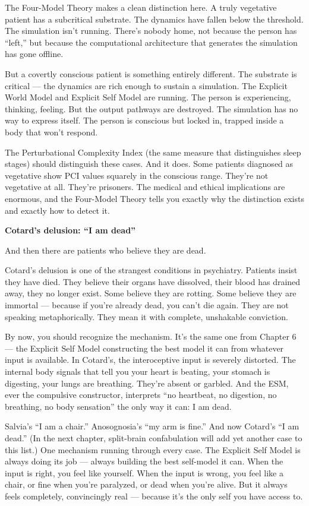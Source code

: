 \documentclass[11pt, twoside, openright]{book}
\begin{document}
The Four-Model Theory makes a clean distinction here. A truly vegetative patient has a subcritical substrate. The dynamics have fallen below the threshold. The simulation isn't running. There's nobody home, not because the person has ``left,'' but because the computational architecture that generates the simulation has gone offline.

But a covertly conscious patient is something entirely different. The substrate is critical --- the dynamics are rich enough to sustain a simulation. The Explicit World Model and Explicit Self Model are running. The person is experiencing, thinking, feeling. But the output pathways are destroyed. The simulation has no way to express itself. The person is conscious but locked in, trapped inside a body that won't respond.

The Perturbational Complexity Index (the same measure that distinguishes sleep stages) should distinguish these cases. And it does. Some patients diagnosed as vegetative show PCI values squarely in the conscious range. They're not vegetative at all. They're prisoners. The medical and ethical implications are enormous, and the Four-Model Theory tells you exactly why the distinction exists and exactly how to detect it.

\textbf{Cotard's delusion: ``I am dead''}

And then there are patients who believe they are dead.

Cotard's delusion is one of the strangest conditions in psychiatry. Patients insist they have died. They believe their organs have dissolved, their blood has drained away, they no longer exist. Some believe they are rotting. Some believe they are immortal --- because if you're already dead, you can't die again. They are not speaking metaphorically. They mean it with complete, unshakable conviction.

By now, you should recognize the mechanism. It's the same one from Chapter 6 --- the Explicit Self Model constructing the best model it can from whatever input is available. In Cotard's, the interoceptive input is severely distorted. The internal body signals that tell you your heart is beating, your stomach is digesting, your lungs are breathing. They're absent or garbled. And the ESM, ever the compulsive constructor, interprets ``no heartbeat, no digestion, no breathing, no body sensation'' the only way it can: I am dead.

Salvia's ``I am a chair.'' Anosognosia's ``my arm is fine.'' And now Cotard's ``I am dead.'' (In the next chapter, split-brain confabulation will add yet another case to this list.) One mechanism running through every case. The Explicit Self Model is always doing its job --- always building the best self-model it can. When the input is right, you feel like yourself. When the input is wrong, you feel like a chair, or fine when you're paralyzed, or dead when you're alive. But it always feels completely, convincingly real --- because it's the only self you have access to.
\end{document}
